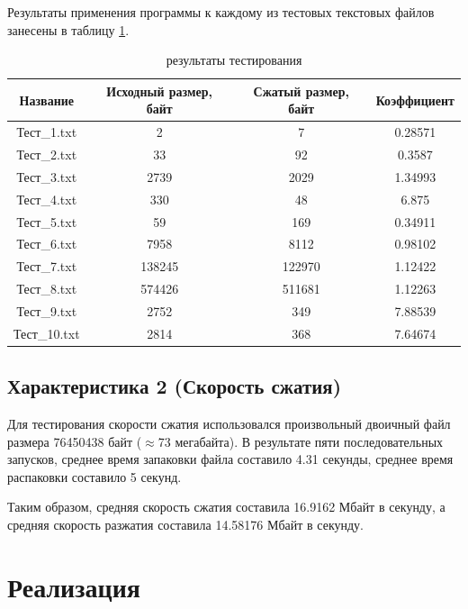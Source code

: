 \documentclass[a4paper,oneside]{article}
\theoremstyle{definition}
\begin{document}
Результаты применения программы к каждому из тестовых текстовых файлов занесены
в таблицу \ref{tbl:results}.

\begin{table}[H]
  \small
  \centering
  \begin{tabular}{|c|c|c|c|}
    \hline
    Название     & Исходный размер, байт & Сжатый размер, байт & Коэффициент \\ \hline \hline
    Тест\_1.txt  & 2           & 7           & 0.28571   \\ \hline
    Тест\_2.txt  & 33          & 92          & 0.3587    \\ \hline
    Тест\_3.txt  & 2739        & 2029        & 1.34993   \\ \hline
    Тест\_4.txt  & 330         & 48          & 6.875     \\ \hline
    Тест\_5.txt  & 59          & 169         & 0.34911   \\ \hline
    Тест\_6.txt  & 7958        & 8112        & 0.98102   \\ \hline
    Тест\_7.txt  & 138245      & 122970      & 1.12422   \\ \hline
    Тест\_8.txt  & 574426      & 511681      & 1.12263   \\ \hline
    Тест\_9.txt  & 2752        & 349         & 7.88539   \\ \hline
    Тест\_10.txt & 2814        & 368         & 7.64674   \\ \hline
  \end{tabular}
  \caption{результаты тестирования}
  \label{tbl:results}
\end{table}

\subsection{Характеристика 2 (Скорость сжатия)}

Для тестирования скорости сжатия использовался произвольный двоичный
файл размера 76450438 байт ($\approx$73 мегабайта). В результате пяти
последовательных запусков, среднее время запаковки файла составило 4.31
секунды, среднее время распаковки составило 5 секунд.

Таким образом, средняя скорость сжатия составила 16.9162 Мбайт в секунду, а
средняя скорость разжатия составила 14.58176 Мбайт в секунду.


\section{Реализация}
\end{document}
